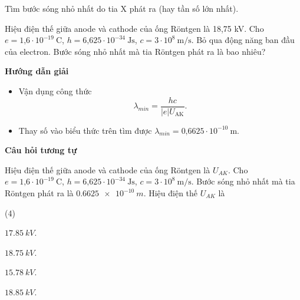 \begin{dang}{Tìm bước sóng nhỏ nhất do tia X phát ra (hay tần số lớn nhất).}
	
	
	{
		Hiệu điện thế giữa anode và cathode của ống R\"ontgen là 18,75 kV. Cho $e =\text{1,6} \cdot 10^{-19}\ \text{C}$, $h = \text{6,625}\cdot 10^{-34}\ \text{Js}$, $c = 3\cdot 10^8\ \text{m/s}$. Bỏ qua động năng ban đầu của electron. Bước sóng nhỏ nhất mà tia R\"ontgen phát ra là bao nhiêu?}
	{\begin{center}
			\textbf{Hướng dẫn giải}
		\end{center}
		\begin{itemize}
			\item Vận dụng công thức 
			\begin{equation*}
				\lambda_{min}= \dfrac{hc}{|e|U_{\text{AK}}}.
			\end{equation*}
			\item Thay số vào biểu thức trên tìm được $\lambda_{min}=\text{0,6625} \cdot 10^{-10}\ \text{m}$.
		\end{itemize}
		\begin{center}
			\textbf{Câu hỏi tương tự}
		\end{center}
		
		Hiệu điện thế giữa anode và cathode của ống R\"ontgen là $ U_{AK} $. Cho $e =\text{1,6} \cdot 10^{-19}\ \text{C}$, $h = \text{6,625}\cdot 10^{-34}\ \text{Js}$, $c = 3\cdot 10^8\ \text{m/s}$. Bước sóng nhỏ nhất mà tia R\"ontgen phát ra là $ \SI{0,6625 e-10}{m} $. Hiệu điện thế $ U_{AK} $ là
		\begin{mcq}(4)
			\item $ \SI{17,85}{kV} $.
			\item $ \SI{18,75}{kV} $.
			\item $ \SI{15,78}{kV} $.
			\item $ \SI{18,85}{kV} $.
		\end{mcq}
		
}
\end{dang}
